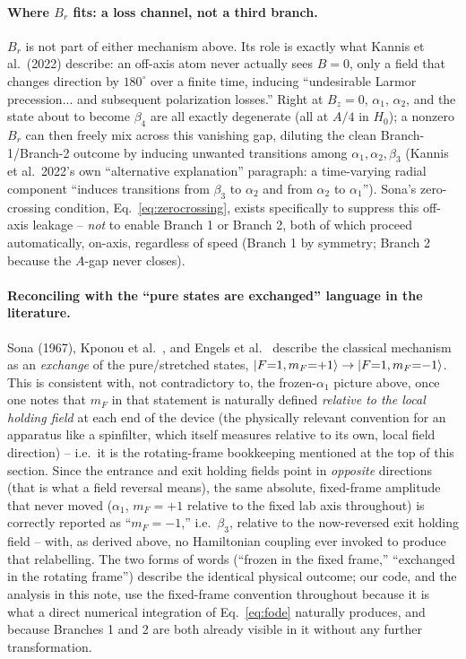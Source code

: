 \documentclass[11pt,a4paper]{article}
\begin{document}
\paragraph{Where $B_r$ fits: a loss channel, not a third branch.} $B_r$ is
not part of either mechanism above. Its role is exactly what Kannis et al.\
(2022) describe: an off-axis atom never actually sees $B=0$, only a field
that changes direction by $180^\circ$ over a finite time, inducing
``undesirable Larmor precession... and subsequent polarization losses.''
Right at $B_z=0$, $\alpha_1$, $\alpha_2$, and the state about to become
$\beta_4$ are all exactly degenerate (all at $A/4$ in $H_0$); a nonzero
$B_r$ can then freely mix across this vanishing gap, diluting the clean
Branch-1/Branch-2 outcome by inducing unwanted transitions among
$\alpha_1,\alpha_2,\beta_3$ (Kannis et al.\ 2022's own ``alternative
explanation'' paragraph: a time-varying radial component ``induces
transitions from $\beta_3$ to $\alpha_2$ and from $\alpha_2$ to
$\alpha_1$''). Sona's zero-crossing condition, Eq.~\eqref{eq:zerocrossing},
exists specifically to suppress this off-axis leakage -- \emph{not} to
enable Branch 1 or Branch 2, both of which proceed automatically, on-axis,
regardless of speed (Branch 1 by symmetry; Branch 2 because the $A$-gap
never closes).

\paragraph{Reconciling with the ``pure states are exchanged'' language in
the literature.} Sona (1967), Kponou et al.\ \cite{kponou2007}, and Engels
et al.\ \cite{engels2024} describe the classical mechanism as an
\emph{exchange} of the pure/stretched states, $\ket{F{=}1,m_F{=}{+}1}\to
\ket{F{=}1,m_F{=}{-}1}$. This is consistent with, not contradictory to, the
frozen-$\alpha_1$ picture above, once one notes that $m_F$ in that
statement is naturally defined \emph{relative to the local holding field}
at each end of the device (the physically relevant convention for an
apparatus like a spinfilter, which itself measures relative to its own,
local field direction) -- i.e.\ it is the rotating-frame bookkeeping
mentioned at the top of this section. Since the entrance and exit holding
fields point in \emph{opposite} directions (that is what a field reversal
means), the same absolute, fixed-frame amplitude that never moved
($\alpha_1$, $m_F=+1$ relative to the fixed lab axis throughout) is
correctly reported as ``$m_F=-1$,'' i.e.\ $\beta_3$, relative to the
now-reversed exit holding field -- with, as derived above, no Hamiltonian
coupling ever invoked to produce that relabelling. The two forms of words
(``frozen in the fixed frame,'' ``exchanged in the rotating frame'')
describe the identical physical outcome; our code, and the analysis in this
note, use the fixed-frame convention throughout because it is what a direct
numerical integration of Eq.~\eqref{eq:fode} naturally produces, and because
Branches 1 and 2 are both already visible in it without any further
transformation.
\label{sec:status}
\end{document}
